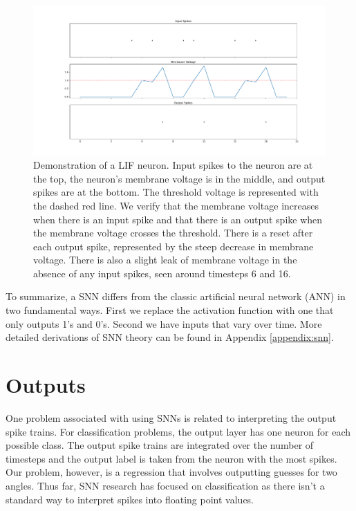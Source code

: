 \documentclass [MS] {UCLAthesis}
\begin{document}
\begin{figure}
    \centering
    \includegraphics[width=\textwidth]{snn_spike_example}
    \caption[Leaky Integrate-and-Fire (LIF) neuron membrane voltage demonstration]{Demonstration of a LIF neuron. Input spikes to the neuron are at the top, the neuron's membrane voltage is in the middle, and output spikes are at the bottom. The threshold voltage is represented with the dashed red line. We verify that the membrane voltage increases when there is an input spike and that there is an output spike when the membrane voltage crosses the threshold. There is a reset after each output spike, represented by the steep decrease in membrane voltage. There is also a slight leak of membrane voltage in the absence of any input spikes, seen around timesteps 6 and 16.}
    \label{fig:lif_spike_example}
\end{figure}

To summarize, a SNN differs from the classic artificial neural network (ANN) in two fundamental ways. First we replace the activation function with one that only outputs 1's and 0's. Second we have inputs that vary over time. More detailed derivations of SNN theory can be found in Appendix \ref{appendix:snn}.


\section{Outputs}

One problem associated with using SNNs is related to interpreting the output spike trains. For classification problems, the output layer has one neuron for each possible class. The output spike trains are integrated over the number of timesteps and the output label is taken from the neuron with the most spikes. Our problem, however, is a regression that involves outputting guesses for two angles. Thus far, SNN research has focused on classification as there isn't a standard way to interpret spikes into floating point values.
\end{document}

